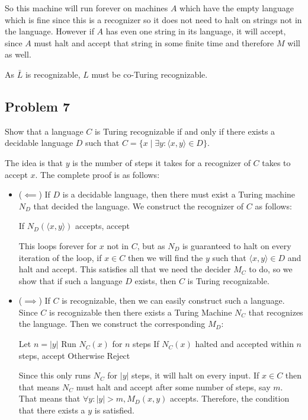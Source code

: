 \documentclass[english]{article}
\begin{document}
So this machine will run forever on machines $A$ which have the empty language
which is fine since this is a recognizer so it does not need to halt on 
strings not in the language. However if $A$ has even one string in its
language, it will accept, since $A$ must halt and accept that string in some
finite time and therefore $M$ will as well.

As $\bar{L}$ is recognizable, $L$ must be co-Turing recognizable. 

\subsection*{Problem 7}
Show that a language $C$ is Turing recognizable if and only if there exists a 
decidable language $D$ such that
$C = \{ x \mid \exists y : \langle x, y \rangle \in D\}$.

The idea is that $y$ is the number of steps it takes for a recognizer of $C$
takes to accept $x$. The complete proof is as follows:
\begin{itemize}
\item ($ \impliedby $) If $D$ is a decidable language, then there must exist
	a Turing machine $N_D$ that decided the language. We construct the
	recognizer of $C$ as follows:
\begin{algorithmic}
		\State If $N_D(\langle x, y \rangle)$ accepts, accept 
	\EndFor 
\EndFunction
\end{algorithmic}

This loops forever for $x$ not in $C$, but as $N_D$ is guaranteed to halt
on every iteration of the loop, if $x \in C$ then we will find the $y$
such that $\langle x,y \rangle \in D$ and halt and accept. This satisfies
all that we need the decider $M_C$ to do, so we show that if such a
language $D$ exists, then $C$ is Turing recognizable.

\item ($ \implies $) If $C$ is recognizable, then we can easily construct
	such a language. Since $C$ is recognizable then there exists a
	Turing Machine $N_C$ that recognizes the language. Then we construct
	the corresponding $M_D$:
\begin{algorithmic}
	\State Let $n = |y|$
	\State Run $N_C(x)$ for $n$ steps
	\State If $N_C(x)$ halted and accepted within $n$ steps, accept
	\State Otherwise Reject
\EndFunction
\end{algorithmic}

Since this only runs $N_C$ for $|y|$ steps, it will halt on every input. If
$x \in C$ then that means $N_C$ must halt and accept after some number of 
steps, say $m$. That means that $\forall y : |y| > m, M_D(x,y)$ accepts. 
Therefore, the condition that there exists a $y$ is satisfied.
\end{itemize}
\end{document}
